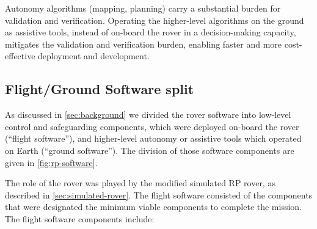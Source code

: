 \documentclass[twocolumn,letterpaper]{IEEEAerospaceCLS}  %
\begin{document}
Autonomy algorithms (mapping, planning) carry a substantial burden for validation and verification.  Operating the higher-level algorithms on the ground as assistive tools, instead of on-board the rover in a decision-making capacity, mitigates the validation and verification burden, enabling faster and more cost-effective deployment and development.

\subsection{Flight/Ground Software split}

As discussed in \cref{sec:background} we divided the rover software into low-level control and safeguarding components, which were deployed on-board the rover (``flight software''), and higher-level autonomy or assistive tools which operated on Earth (``ground software'').  
The division of those software components are given in \cref{fig:rp-software}.  

The role of the rover was played by the modified simulated RP rover, as described in \cref{sec:simulated-rover}.  The flight software consisted of the components that were designated the minimum viable components to complete the mission.  The flight software components include:
\end{document}
